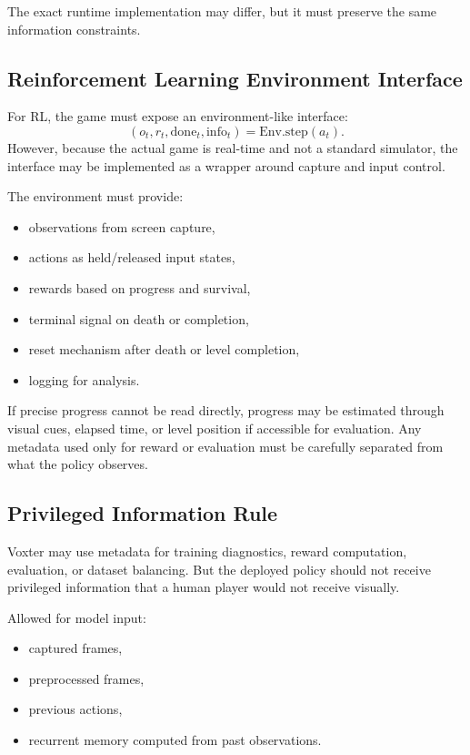\documentclass[11pt]{article}
\newcommand{\Env}{\mathrm{Env}}
\begin{document}
The exact runtime implementation may differ, but it must preserve the same information constraints.

\subsection{Reinforcement Learning Environment Interface}

For RL, the game must expose an environment-like interface:
\[
  (o_t,r_t,\mathrm{done}_t,\mathrm{info}_t)
  =
  \Env.\mathrm{step}(a_t).
\]
However, because the actual game is real-time and not a standard simulator, the interface may be implemented as a wrapper around capture and input control.

The environment must provide:
\begin{itemize}
  \item observations from screen capture,
  \item actions as held/released input states,
  \item rewards based on progress and survival,
  \item terminal signal on death or completion,
  \item reset mechanism after death or level completion,
  \item logging for analysis.
\end{itemize}

If precise progress cannot be read directly, progress may be estimated through visual cues, elapsed time, or level position if accessible for evaluation. Any metadata used only for reward or evaluation must be carefully separated from what the policy observes.

\subsection{Privileged Information Rule}

Voxter may use metadata for training diagnostics, reward computation, evaluation, or dataset balancing. But the deployed policy should not receive privileged information that a human player would not receive visually.

Allowed for model input:
\begin{itemize}
  \item captured frames,
  \item preprocessed frames,
  \item previous actions,
  \item recurrent memory computed from past observations.
\end{itemize}
\end{document}
